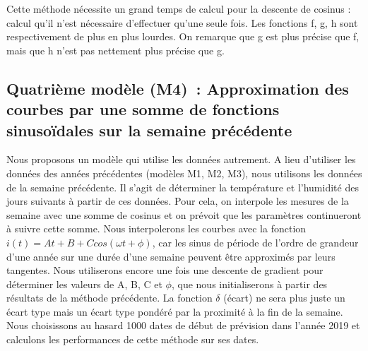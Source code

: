 \documentclass[11pt,a4paper]{article}
\begin{document}
Cette méthode nécessite un grand temps de calcul pour la descente de cosinus : calcul qu'il n'est nécessaire d'effectuer qu'une seule fois. Les fonctions f, g, h sont respectivement de plus en plus lourdes. On remarque que g est plus précise que f, mais que h n'est pas nettement plus précise que g.


\subsection {Quatrième modèle (M4)~: Approximation des courbes par une somme de fonctions sinusoïdales sur la semaine précédente }
Nous proposons un modèle qui utilise les données autrement. A lieu d'utiliser les données des années précédentes (modèles M1, M2, M3), nous utilisons les données de la semaine précédente.  
Il s'agit de déterminer la température et l'humidité des jours suivants à partir de ces données. Pour cela, on interpole les mesures de la semaine avec une somme de cosinus et on prévoit que les paramètres continueront à suivre cette somme. Nous interpolerons les courbes avec la fonction $i(t) = At + B + C cos  (\omega t + \phi)$,  car les sinus de période de l'ordre de grandeur d'une année sur une durée  d'une semaine peuvent être approximés par leurs tangentes. Nous utiliserons encore une fois une descente de gradient pour déterminer les valeurs de A, B, C et $\phi$, que nous initialiserons à partir des résultats de la méthode précédente. La fonction $\delta$ (écart) ne sera plus juste un écart type mais un écart type pondéré par la proximité à la fin de la semaine. \\
Nous choisissons au hasard 1000 dates de début de prévision dans l'année 2019 et calculons les performances de cette méthode sur ses dates.\\
\end{document}
